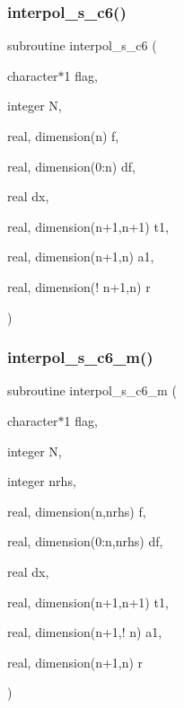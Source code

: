 \subsubsection{\texorpdfstring{interpol\+\_\+s\+\_\+c6()}{interpol\_s\_c6()}}
{\footnotesize\ttfamily subroutine interpol\+\_\+s\+\_\+c6 (\begin{DoxyParamCaption}\item[{character$\ast$1}]{flag,  }\item[{integer}]{N,  }\item[{real, dimension(n)}]{f,  }\item[{real, dimension(0\+:n)}]{df,  }\item[{real}]{dx,  }\item[{real, dimension(n+1,n+1)}]{t1,  }\item[{real, dimension(n+1,n)}]{a1,  }\item[{real, dimension(! n+1,n)}]{r }\end{DoxyParamCaption})}

\mbox{\label{ders__n_8f_a918a09401cafa54f2581d0957ffec441}} 
\subsubsection{\texorpdfstring{interpol\+\_\+s\+\_\+c6\+\_\+m()}{interpol\_s\_c6\_m()}}
{\footnotesize\ttfamily subroutine interpol\+\_\+s\+\_\+c6\+\_\+m (\begin{DoxyParamCaption}\item[{character$\ast$1}]{flag,  }\item[{integer}]{N,  }\item[{integer}]{nrhs,  }\item[{real, dimension(n,nrhs)}]{f,  }\item[{real, dimension(0\+:n,nrhs)}]{df,  }\item[{real}]{dx,  }\item[{real, dimension(n+1,n+1)}]{t1,  }\item[{real, dimension(n+1,! n)}]{a1,  }\item[{real, dimension(n+1,n)}]{r }\end{DoxyParamCaption})}

